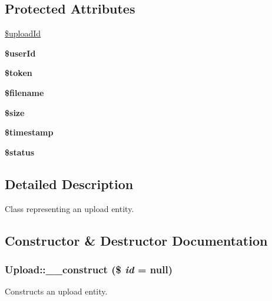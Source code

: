 \subsection*{Protected Attributes}
\begin{DoxyCompactItemize}
\item 
\hyperlink{classUpload_a9757b15a3aa26eb0bfe3b995f49f5c60}{\$uploadId}
\item 
\hypertarget{classUpload_ab25af16d1dd82feb630d8bdb48b5aacd}{
{\bfseries \$userId}}
\label{classUpload_ab25af16d1dd82feb630d8bdb48b5aacd}

\item 
\hypertarget{classUpload_a1ad85aaac6612ba283204ec8d2f96f89}{
{\bfseries \$token}}
\label{classUpload_a1ad85aaac6612ba283204ec8d2f96f89}

\item 
\hypertarget{classUpload_ab3672483f56ce99551812d829f97f4c1}{
{\bfseries \$filename}}
\label{classUpload_ab3672483f56ce99551812d829f97f4c1}

\item 
\hypertarget{classUpload_a0ecc59a7c1b6901a146c49f0c340c069}{
{\bfseries \$size}}
\label{classUpload_a0ecc59a7c1b6901a146c49f0c340c069}

\item 
\hypertarget{classUpload_a2f526901ecc4c640b4164271e2465406}{
{\bfseries \$timestamp}}
\label{classUpload_a2f526901ecc4c640b4164271e2465406}

\item 
\hypertarget{classUpload_ac36d847bb85caac1f2cd8b1d92844bdd}{
{\bfseries \$status}}
\label{classUpload_ac36d847bb85caac1f2cd8b1d92844bdd}

\end{DoxyCompactItemize}


\subsection{Detailed Description}
Class representing an upload entity. 

\subsection{Constructor \& Destructor Documentation}
\hypertarget{classUpload_afba84940efd09dcba276b0bceee05f4d}{
\subsubsection[{\_\-\_\-construct}]{\setlength{\rightskip}{0pt plus 5cm}Upload::\_\-\_\-construct (\$ {\em id} = {\ttfamily null})}}
\label{classUpload_afba84940efd09dcba276b0bceee05f4d}
Constructs an upload entity.


